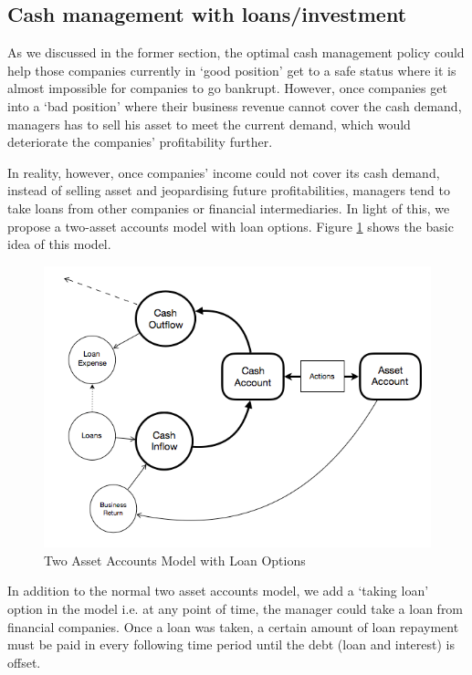 \documentclass[12pt]{article}
\begin{document}
\subsection{Cash management with loans/investment}
As we discussed in the former section, the optimal cash management policy could help those companies currently in `good position' get to a safe status where it is almost impossible for companies to go bankrupt. However, once companies get into a `bad position' where their business revenue cannot cover the cash demand, managers has to sell his asset to meet the current demand, which would deteriorate the companies' profitability further. 

In reality, however, once companies' income could not cover its cash demand, instead of selling asset and jeopardising future profitabilities, managers tend to take loans from other companies or financial intermediaries. In light of this, we propose a two-asset accounts model with loan options. Figure \ref{loan} shows the basic idea of this model. 

\begin{figure}
\begin{center}
\includegraphics[scale=.43]{loan}
\end{center}
\caption{Two Asset Accounts Model with Loan Options}
\label{loan}
\end{figure}

In addition to the normal two asset accounts model, we add a `taking loan' option in the model i.e. at any point of time, the manager could take a loan from financial companies. Once a loan was taken, a certain amount of loan repayment must be paid in every following time period until the debt (loan and interest) is offset.   
\end{document}

